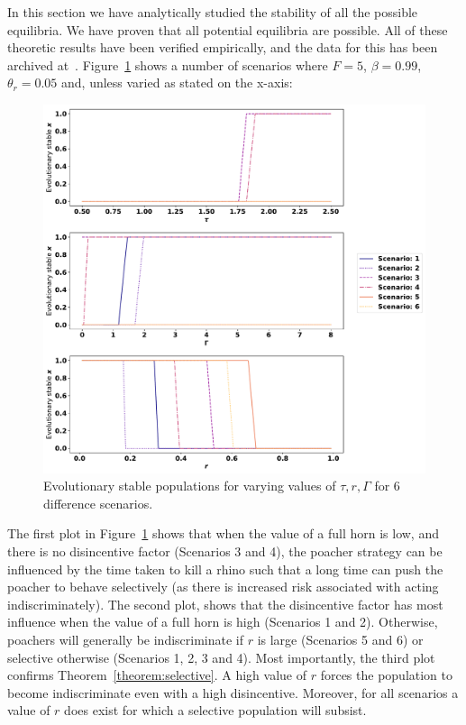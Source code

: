\documentclass[10pt]{article}
\begin{document}
In this section we have analytically studied the stability of all the possible
equilibria. We have proven that all potential equilibria are possible.  All of
these theoretic results have been verified empirically, and the data for this
has been archived at~\cite{Glynatsi2017}.
Figure~\ref{fig:convergence-over-r} shows a number of scenarios where \(F=5\),
\(\beta=0.99\), \(\theta_r = 0.05\) and, unless varied as stated on the x-axis:

\begin{itemize}
    
\end{itemize}

\begin{figure}[!htbp]
    \includegraphics[width=\textwidth]{images/steady_populations.pdf}
    \caption{Evolutionary stable populations for varying values of \(\tau, r,
    \Gamma\) for 6 difference scenarios.}
    \label{fig:convergence-over-r}
\end{figure}

The first plot in Figure~\ref{fig:convergence-over-r} shows that when the value
of a full horn is low, and there is no disincentive factor (Scenarios 3 and 4),
the poacher strategy can be influenced by the time taken to kill a rhino such
that a long time can push the poacher to behave selectively (as there is
increased risk associated with acting indiscriminately). The second plot, shows
that the disincentive factor has most influence when the value of a full horn is
high (Scenarios 1 and 2). Otherwise, poachers will generally be indiscriminate
if \(r\) is large (Scenarios 5 and 6) or selective otherwise (Scenarios 1, 2, 3
and 4).  Most importantly, the third plot
confirms Theorem~\ref{theorem:selective}. A high value of \(r\)
forces the population to become indiscriminate even with a high disincentive.
Moreover, for all scenarios a value of \(r\) does exist for which a selective
population will subsist.
\end{document}
